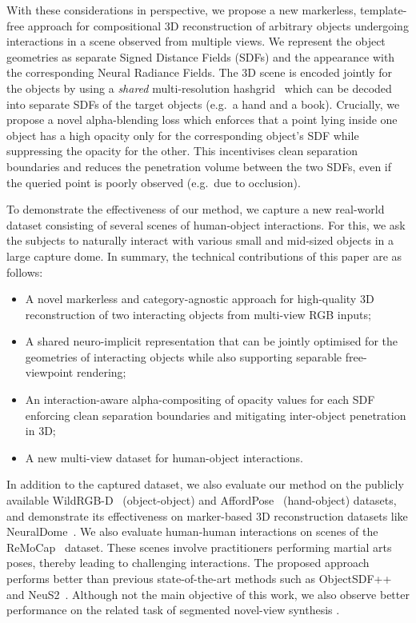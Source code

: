 \par
With these considerations in perspective, we propose a new markerless, template-free approach for compositional 3D reconstruction of arbitrary objects undergoing interactions in a scene observed from 
multiple views. 
We represent the object geometries as separate Signed Distance Fields (SDFs) and the appearance with the corresponding Neural Radiance Fields. 
The 3D scene is encoded jointly for the objects by using a \textit{shared} multi-resolution hashgrid~\cite{mueller2022instant} which can be decoded into separate SDFs of the  target objects (e.g.~a hand and a book). 
Crucially, we propose a novel alpha-blending loss which enforces that a point lying inside one object has a high opacity only for the corresponding object's SDF while suppressing the opacity for the other. 
This incentivises clean separation boundaries and reduces the penetration volume between the two SDFs, even if the queried point is poorly observed (e.g.~due to occlusion). 
\par
To demonstrate the effectiveness of our method, we capture a new real-world dataset consisting of several scenes of human-object
interactions. 
For this, we ask the subjects to naturally interact with various small and mid-sized objects in a large capture dome. 
In summary, the technical contributions of this paper are as follows: 
\begin{itemize}[noitemsep]
    \item A novel markerless and category-agnostic approach for high-quality 3D reconstruction of two interacting objects from multi-view RGB inputs; 
    \item A shared neuro-implicit representation that can be jointly optimised for the geometries of interacting objects while also supporting separable free-viewpoint rendering; 
    \item An interaction-aware alpha-compositing of opacity values for each SDF enforcing clean separation boundaries and mitigating inter-object 
    penetration in 3D; 
    \item A new multi-view dataset for human-object interactions. 
\end{itemize} 

In addition to the captured dataset, we also evaluate our method on the publicly available WildRGB-D~\cite{xia2024rgbd} (object-object) and AffordPose~\cite{affordpose} (hand-object) datasets, and 
demonstrate its effectiveness on marker-based 3D reconstruction datasets like NeuralDome~\cite{zhang2023neuraldome}. 
We also evaluate human-human interactions on scenes of the ReMoCap~\cite{ghosh2024remos} dataset. 
These scenes involve practitioners performing martial arts poses, thereby leading to challenging interactions. 
The proposed approach performs better than previous state-of-the-art methods such as ObjectSDF++~\cite{Wu2023objectsdfplus} and NeuS2~\cite{neus2}. 
Although not the main objective of this work, we also observe better performance on the related task of segmented novel-view synthesis \cite{mildenhall2020nerf, mueller2022instant}. 
